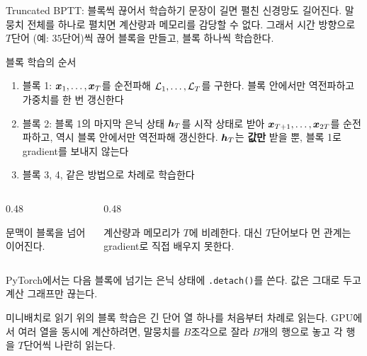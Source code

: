 \documentclass[aspectratio=169,11pt]{beamer}
\begin{document}
\begin{frame}{Truncated BPTT: 블록씩 끊어서 학습하기}
문장이 길면 펼친 신경망도 길어진다. 말뭉치 전체를 하나로 펼치면 계산량과 메모리를 감당할 수 없다.
그래서 시간 방향으로 $T$단어 (예: $35$단어)씩 끊어 블록을 만들고, 블록 하나씩 학습한다.
\end{frame}

\begin{frame}{블록 학습의 순서}
\begin{enumerate}
\item 블록 1: $\bm{x}_1,\dots,\bm{x}_T$를 순전파해 $\mathcal{L}_1,\dots,\mathcal{L}_T$를 구한다.
블록 안에서만 역전파하고 가중치를 한 번 갱신한다
\item 블록 2: 블록 1의 마지막 은닉 상태 $\bm{h}_T$를 시작 상태로 받아
$\bm{x}_{T+1},\dots,\bm{x}_{2T}$를 순전파하고, 역시 블록 안에서만 역전파해 갱신한다.
$\bm{h}_T$는 \textbf{값만} 받을 뿐, 블록 1로 gradient를 보내지 않는다
\item 블록 3, 4,  같은 방법으로 차례로 학습한다
\end{enumerate}
\vskip1mm
\begin{columns}[T,onlytextwidth]
\begin{column}{0.48\textwidth}
\begin{keybox}
문맥이 블록을 넘어 이어진다.
\end{keybox}
\end{column}
\begin{column}{0.48\textwidth}
\begin{keybox}
계산량과 메모리가 $T$에 비례한다.
대신 $T$단어보다 먼 관계는 gradient로 직접 배우지 못한다.
\end{keybox}
\end{column}
\end{columns}
\vskip1mm
PyTorch에서는 다음 블록에 넘기는 은닉 상태에 \texttt{.detach()}를 쓴다.
값은 그대로 두고 계산 그래프만 끊는다.
\end{frame}

\begin{frame}{미니배치로 읽기}
위의 블록 학습은 긴 단어 열 하나를 처음부터 차례로 읽는다.
GPU에서 여러 열을 동시에 계산하려면, 말뭉치를 $B$조각으로 잘라 $B$개의 행으로 놓고
각 행을 $T$단어씩 나란히 읽는다.
\end{frame}
\end{document}
